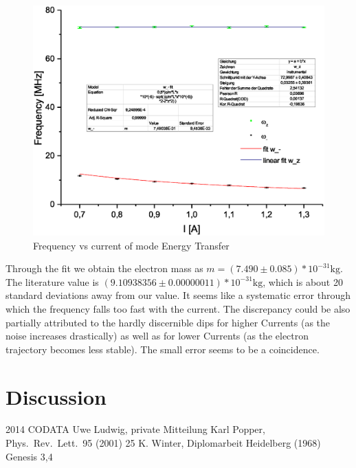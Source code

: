\documentclass[12pt]{article}
\begin{document}
\begin{figure}[h]
  \centering
  \includegraphics[width=20cm,bbllx=112,bburx=447,bblly=264,bbury=582]{Graph4.eps}
  \caption{Frequency vs current of mode Energy Transfer}
  \label{fig::varCur}
\end{figure}

Through the fit we obtain the electron mass as $m = (7.490 \pm 0.085)*10^{-31}\text{kg}$. The literature value is $(9.10938356 \pm 0.00000011)*10^{-31}\text{kg}$\cite{cod}, which is about 20 standard deviations away from our value.
It seems like a systematic error through which the frequency falls too fast with the current.
The discrepancy could be also partially attributed to the hardly discernible dips for higher Currents (as the noise increases drastically) as well as for lower Currents (as the electron trajectory becomes less stable).
The small error seems to be a coincidence.
\section{Discussion}

\newpage 


\begin{thebibliography}{00}   %

 2014 CODATA
 Uwe Ludwig, private Mitteilung
 Karl Popper, Phys.~Rev.~Lett.~95 (2001) 25
 K. Winter, Diplomarbeit Heidelberg (1968)
 Genesis 3,4

\end{thebibliography}
\end{document}

